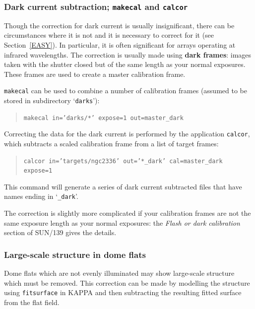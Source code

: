 \documentclass[twoside,11pt]{article}
\newcommand{\xref}[3]{#1}
\begin{document}
\subsubsection{Dark current subtraction; {\tt makecal} and {\tt calcor}}

Though the correction for dark current is usually insignificant, there
can be circumstances where it is not and it is necessary to correct for
it (see Section~\ref{EASY}).  In particular, it is often significant
for arrays operating at infrared wavelengths.  The correction is usually
made using {\bf dark frames}: images taken with the shutter closed but of
the same length as your normal exposures.  These frames are used to create
a master calibration frame.

{\tt makecal} can be used to combine a number of calibration frames
(assumed to be stored in subdirectory `{\tt darks}'):

\begin{quote}
{\tt makecal in='darks/*' expose=1 out=master\_dark}
\end{quote}

Correcting the data for the dark current is performed by the application
{\tt calcor}, which subtracts a scaled calibration frame from a list of
target frames:

\begin{quote}
{\tt calcor in='targets/ngc2336' out='*\_dark' cal=master\_dark 
expose=1}
\end{quote}

This command will generate a series of dark current subtracted files that
have names ending in `{\tt \_dark}'.

The correction is slightly more complicated if your calibration frames
are not the same exposure length as your normal exposures: the
\xref{{\it Flash or dark calibration}}{sun139}{flashordark}\/ section
of \xref{SUN/139}{sun139}{}\/\cite{SUN139} gives the details.

\subsubsection{Large-scale structure in dome flats}

Dome flats which are not evenly illuminated may show large-scale structure
which must be removed.  This correction can be made by modelling the
structure using \xref{{\tt fitsurface}}{sun95}{FITSURFACE} in KAPPA
and then subtracting the resulting fitted surface from the flat field.
\end{document}
